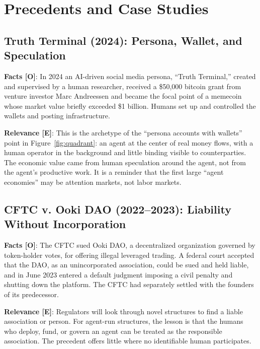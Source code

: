 \documentclass[11pt,letterpaper]{article}
\begin{document}
\section{Precedents and Case Studies}

\subsection{Truth Terminal (2024): Persona, Wallet, and Speculation}

\begin{casebox}
\textbf{Facts [O]}: In 2024 an AI-driven social media persona, ``Truth Terminal,'' created and supervised by a human researcher, received a \$50,000 bitcoin grant from venture investor Marc Andreessen and became the focal point of a memecoin whose market value briefly exceeded \$1 billion. Humans set up and controlled the wallets and posting infrastructure.

\textbf{Relevance [E]}: This is the archetype of the ``persona accounts with wallets'' point in Figure~\ref{fig:quadrant}: an agent at the center of real money flows, with a human operator in the background and little binding visible to counterparties. The economic value came from human speculation around the agent, not from the agent's productive work. It is a reminder that the first large ``agent economies'' may be attention markets, not labor markets.
\end{casebox}

\subsection{CFTC v. Ooki DAO (2022--2023): Liability Without Incorporation}

\begin{casebox}
\textbf{Facts [O]}: The CFTC sued Ooki DAO, a decentralized organization governed by token-holder votes, for offering illegal leveraged trading. A federal court accepted that the DAO, as an unincorporated association, could be sued and held liable, and in June 2023 entered a default judgment imposing a civil penalty and shutting down the platform. The CFTC had separately settled with the founders of its predecessor.

\textbf{Relevance [E]}: Regulators will look through novel structures to find a liable association or person. For agent-run structures, the lesson is that the humans who deploy, fund, or govern an agent can be treated as the responsible association. The precedent offers little where no identifiable human participates.
\end{casebox}
\end{document}
